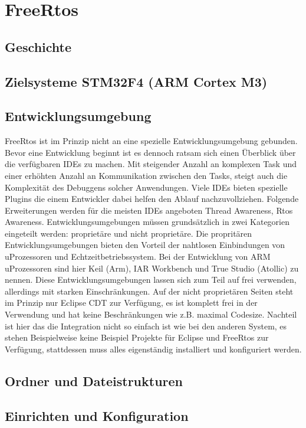 \documentclass[ngerman]{seminarvorlage}
\begin{document}
\section{FreeRtos} 
\subsection{Geschichte}
\subsection{Zielsysteme STM32F4 (ARM Cortex M3)}
\subsection{Entwicklungsumgebung}
FreeRtos ist im Prinzip nicht an eine spezielle Entwicklungsumgebung gebunden. Bevor eine Entwicklung beginnt ist es dennoch ratsam sich einen Überblick über die verfügbaren IDEs zu machen. Mit steigender Anzahl an komplexen Task und einer erhöhten Anzahl an Kommunikation zwischen den Tasks, steigt auch die Komplexität des Debuggens solcher Anwendungen. Viele IDEs bieten spezielle Plugins die einem Entwickler dabei helfen den Ablauf nachzuvollziehen. Folgende Erweiterungen werden für die meisten IDEs angeboten Thread Awareness, Rtos Awareness. Entwicklungsumgebungen müssen grundsätzlich in zwei Kategorien eingeteilt werden: proprietäre und nicht proprietäre. Die propritären Entwicklungsumgebungen bieten den Vorteil der nahtlosen Einbindungen von uProzessoren und Echtzeitbetriebssystem. Bei der Entwicklung von ARM uProzessoren sind hier Keil (Arm), IAR Workbench und True Studio (Atollic) zu nennen. Diese Entwicklungsumgebungen lassen sich zum Teil auf frei verwenden, allerdings mit starken Einschränkungen. Auf der nicht proprietären Seiten steht im Prinzip nur Eclipse CDT zur Verfügung, es ist komplett frei in der Verwendung und hat keine Beschränkungen wie z.B. maximal Codesize. Nachteil ist hier das die Integration nicht so einfach ist wie bei den anderen System, es stehen Beispielweise keine Beispiel Projekte für Eclipse und FreeRtos zur Verfügung, stattdessen muss alles eigenständig installiert und konfiguriert werden.         
\subsection{Ordner und Dateistrukturen} 
\subsection{Einrichten und Konfiguration}
\end{document}
